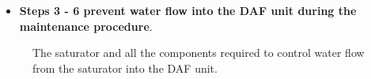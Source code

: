\documentclass[
  12pt,
]{report}
\providecommand{\tightlist}{%
  \setlength{\itemsep}{0pt}\setlength{\parskip}{0pt}}\usepackage{longtable,booktabs,array}
\begin{document}
\begin{itemize}
\tightlist
\item
  \textbf{Steps 3 - 6 prevent water flow into the DAF unit during the
  maintenance procedure}.
\end{itemize}

\begin{figure}[H]

\begin{minipage}[t]{0.50\linewidth}

{\centering 


}

\end{minipage}%
%
\begin{minipage}[t]{0.50\linewidth}

{\centering 


}

\end{minipage}%
\newline
\begin{minipage}[t]{0.50\linewidth}

{\centering 


}

\end{minipage}%
%
\begin{minipage}[t]{0.50\linewidth}

{\centering 


}

\end{minipage}%

\caption{\label{fig-sat-comp}The saturator and all the components
required to control water flow from the saturator into the DAF unit.}

\end{figure}
\end{document}
